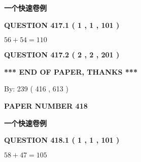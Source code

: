 \documentclass{ctexart}
\begin{document}
   
 \vspace{0.2in}
{\LARGE {\textbf{ 一个快速卷例}}}
   
   
  
\vspace{0.2in}
  
{\textbf{\Large{QUESTION
417.1 
 ( 1 , 1 , 101 )
}}}
  
  
 
 

$ %
56 +  %
54=   %
110$
 
 
  
\vspace{0.2in}
  
{\textbf{\Large{QUESTION
417.2 
 ( 2 , 2 , 201 )
}}}
  
  
   
   
 \vspace{0.2in}
 
   
   
   
   
\vspace{1.0in} 
{\textbf{\large{ *** END OF PAPER, THANKS *** }}} 
   
   
\hspace{1.0in} By: 
 239 ( 416 ,  613 )
   
   
   
   
\newpage 
\setcounter{page}{ 
   418001 } 
   
   
   
   
 {\textbf{ \Large{ PAPER NUMBER  418  }}}
   
   
\vspace{0.2in}
   
   
   
   
   
   
 \vspace{0.2in}
{\LARGE {\textbf{ 一个快速卷例}}}
   
   
  
\vspace{0.2in}
  
{\textbf{\Large{QUESTION
418.1 
 ( 1 , 1 , 101 )
}}}
  
  
 
 

$ %
58 +  %
47=   %
105$
 
 
  
\vspace{0.2in}
  
\end{document}
